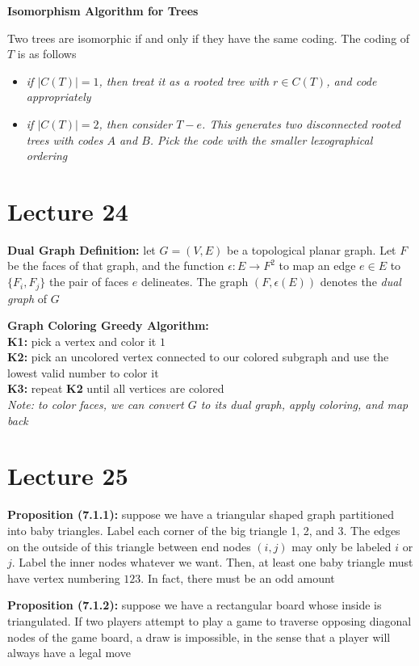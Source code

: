 \documentclass[12pt]{article}
\begin{document}
\textbf{Isomorphism Algorithm for Trees}

Two trees are isomorphic if and only if they have the same coding. The coding of $T$ is as follows
\begin{itemize}
    \item \emph{if $|C(T)| = 1$, then treat it as a rooted tree with $r \in C(T)$, and code appropriately}
    \item \emph{if $|C(T)| = 2$, then consider $T - e$. This generates two disconnected rooted trees with codes $A$ and $B$. Pick the code with the smaller lexographical ordering}
\end{itemize}
\clearpage

\section{Lecture 24}

\textbf{Dual Graph Definition: }let $G = (V, E)$ be a topological planar graph. Let $F$ be the faces of that graph, and the function $\epsilon: E \rightarrow F^2$ to map an edge $e \in E$ to $\{ F_i, F_j \}$ the pair of faces $e$ delineates. The graph $(F, \epsilon(E))$ denotes the \emph{dual graph} of $G$

\textbf{Graph Coloring Greedy Algorithm: }\\
\textbf{K1: }pick a vertex and color it $1$\\
\textbf{K2: }pick an uncolored vertex connected to our colored subgraph and use the lowest valid number to color it\\
\textbf{K3: }repeat \textbf{K2} until all vertices are colored\\
\emph{Note: to color faces, we can convert $G$ to its dual graph, apply coloring, and map back}

\clearpage

\section{Lecture 25}

\textbf{Proposition (7.1.1): }suppose we have a triangular shaped graph partitioned into baby triangles. Label each corner of the big triangle 1, 2, and 3. The edges on the outside of this triangle between end nodes $(i, j)$ may only be labeled $i$ or $j$. Label the inner nodes whatever we want. Then, at least one baby triangle must have vertex numbering $123$. In fact, there must be an odd amount

\textbf{Proposition (7.1.2): }suppose we have a rectangular board whose inside is triangulated. If two players attempt to play a game to traverse opposing diagonal nodes of the game board, a draw is impossible, in the sense that a player will always have a legal move
\end{document}

